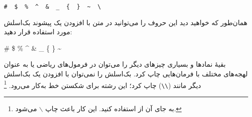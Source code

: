 \begin{code}
\verb.#  $  %  ^  &  _  {  }  ~  \ . %
\end{code}

همان‌طور که خواهید دید این حروف را می‌توانید در متن با افزودن یک پیشوند بک‌اسلش مورد استفاده قرار دهید:

\begin{example}
\# \$ \% \^{} \& \_ \{ \} \~{} 
\end{example}

بقیهٔ نمادها و بسیاری چیزهای دیگر را می‌توان در فرمول‌های ریاضی یا به عنوان لهجه‌های مختلف با فرمان‌هایی چاپ کرد. بک‌اسلش را نمی‌توان با افزودن یک بک‌اسلش
دیگر مانند (\verb|\\|)  چاپ کرد؛ این رشته برای شکستن خط به‌کار می‌رود.%
\footnote{به جای آن از  استفاده کنید. این کار باعث چاپ $\backslash$ می‌شود.}

